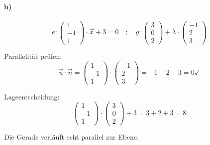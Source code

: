 \documentclass{ajc}
\numberwithin{equation}{subsection}
\begin{document}
	\paragraph{b)}
	\begin{equation}
		e: \left(\begin{array}{r} 1 \\ -1 \\ 1\end{array}\right) \cdot \vec{x} + 3 = 0 \quad ; \quad g: \left(\begin{array}{r} 3 \\ 0 \\ 2\end{array}\right) + \lambda \cdot \left(\begin{array}{r} -1 \\ 2 \\ 3\end{array}\right)
	\end{equation}
	
	Parallelität prüfen:
	\begin{equation}
		\vec{u} \cdot \vec{n} = \left(\begin{array}{r} 1 \\ -1 \\ 1\end{array}\right) \cdot \left(\begin{array}{r} -1 \\ 2 \\ 3\end{array}\right) = - 1 - 2 + 3 = 0 \checkmark
	\end{equation}
	
	Lageentscheidung:
	\begin{equation}
		\left(\begin{array}{r} 1 \\ -1 \\ 1\end{array}\right) \cdot \left(\begin{array}{r} 3 \\ 0 \\ 2\end{array}\right) + 3 = 3 + 2 + 3 = 8
	\end{equation}
	
	Die Gerade verläuft echt parallel zur Ebene.
	
\end{document}
